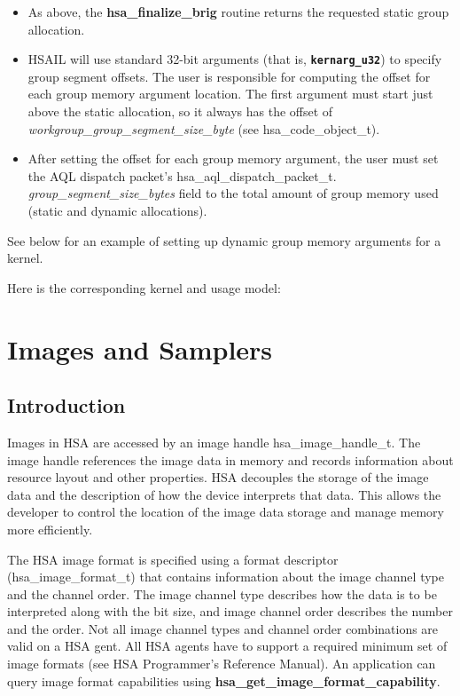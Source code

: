 \documentclass{book}
\newcommand{\diffblock}[1]{#1}
\newcommand{\ttbf}[1]{\diffblock{\texttt{\textbf{#1}}}}
\newcommand{\reffun}[1]{\textbf{#1}}
\newcommand{\reffld}[1]{\textit{#1}}
\newcommand{\reftyp}[1]{#1}
\begin{document}
\begin{appendices}
\begin{itemize}
\item As above, the \reffun{hsa\_finalize\_brig} routine returns the
requested static group allocation.

\item HSAIL will use standard 32-\/bit arguments (that is,
\ttbf{kernarg\_u32}) to specify group segment offsets. The user is
responsible for computing the offset for each group memory argument
location. The first argument must start just above the static
allocation, so it always has the offset of \reffld{workgroup\_group\_segment\_size\_byte} (see \reftyp{hsa\_code\_object\_t}).

\item After setting the offset for each group memory argument, the
  user must set the AQL dispatch packet's
  \reftyp{hsa\_aql\_dispatch\_packet\_t}.\reffld{
    group\_segment\_size\_bytes} field to the total amount of group
  memory used (static and dynamic allocations).

\end{itemize}

See below for an example of setting up dynamic group memory
arguments for a kernel.


Here is the corresponding kernel and usage model:



\chapter{Images and Samplers}
\label{images} \hypertarget{images}{}
\hypertarget{Images}{\section{Introduction} \label{images}} Images in
HSA are accessed by an image handle \reftyp{hsa\_image\_handle\_t}. The
image handle references the image data in memory and records
information about resource layout and other properties. HSA decouples
the storage of the image data and the description of how the device
interprets that data. This allows the developer to control the
location of the image data storage and manage memory more efficiently.

The HSA image format is specified using a format descriptor
(\reftyp{hsa\_image\_format\_t}) that contains information about the
image channel type and the channel order. The image channel type
describes how the data is to be interpreted along with the bit size,
and image channel order describes the number and the order. Not all
image channel types and channel order combinations are valid on a HSA
gent. All HSA agents have to support a required minimum set of image
formats (see HSA Programmer’s Reference Manual). An application can
query image format capabilities using
\reffun{hsa\_get\_image\_format\_capability}.


\end{appendices}
\end{document}
